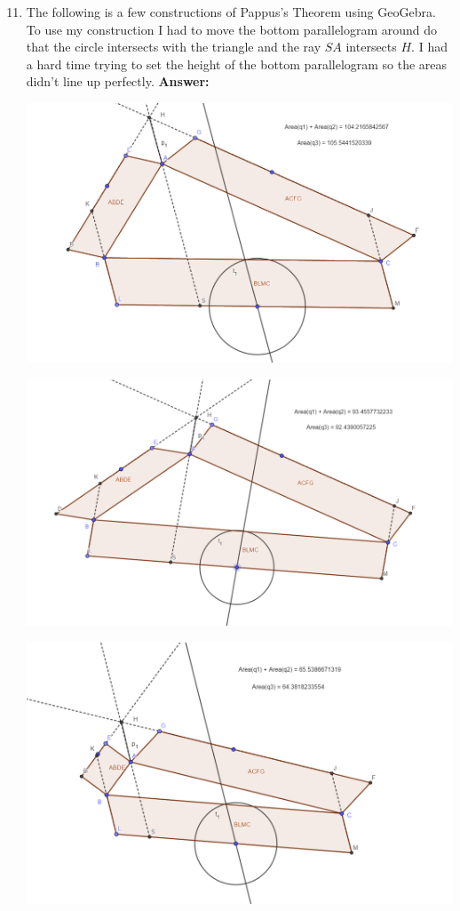 \documentclass[12pt]{article}
\theoremstyle{homework}
\begin{document}
\begin{enumerate}
\setcounter{enumi}{10}
\item The following is a few constructions of Pappus's Theorem using GeoGebra. To use my construction I had to 
move the bottom parallelogram around do that the circle intersects with the triangle and the ray $SA$ intersects $H$. I had a hard time trying to set 
the height of the bottom parallelogram so the areas didn't line up perfectly. 
\textbf{Answer:} 
\begin{center}
  \includegraphics[width = .90\textwidth]{geogebraconstruction.png}
\end{center}  
\begin{center}
  \includegraphics[width = .90\textwidth]{geogebraconstruction1.png}
\end{center}  
\begin{center}
  \includegraphics[width = .90\textwidth]{geogebraconstruction2.png}
\end{center}  






\vspace{.5in}

\end{enumerate}
\end{document}
